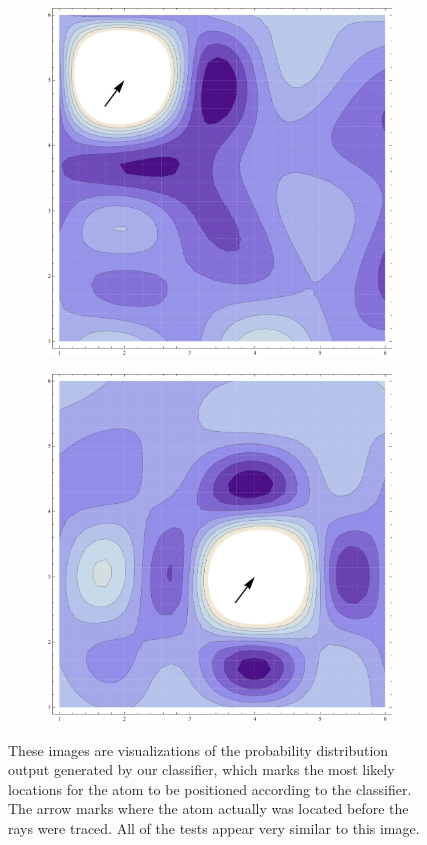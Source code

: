 \begin{figure}
 \label{contours}
\centering
\begin{subfigure}{.5\textwidth}
  \centering
  \includegraphics[scale=.35]{2-5.pdf}
\end{subfigure}%
\begin{subfigure}{.5\textwidth}
  \centering
  \includegraphics[scale=.35]{4-3.pdf}
\end{subfigure}
\label{fig:test2}
\caption{These images are visualizations of the probability distribution output generated by our classifier, which marks the most likely locations for the atom to be positioned according to the classifier. The arrow marks where the atom actually was located before the rays were traced. All of the tests appear very similar to this image.}
\end{figure}
